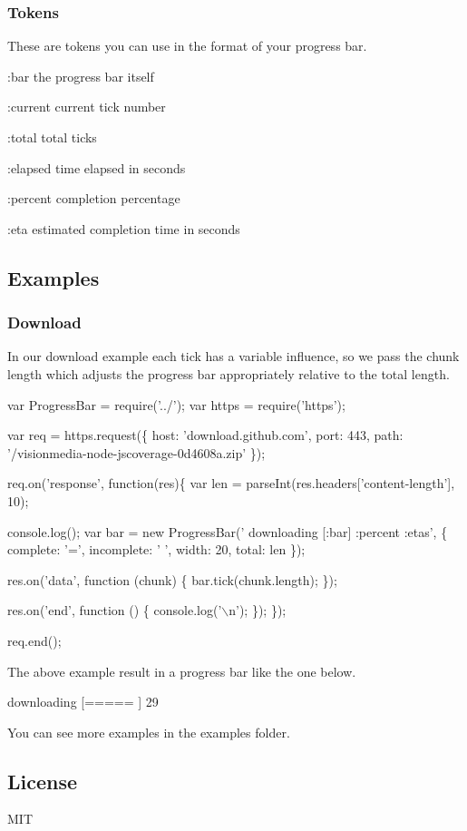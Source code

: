\subsubsection*{Tokens}

These are tokens you can use in the format of your progress bar.


\begin{DoxyItemize}
\item {\ttfamily \+:bar} the progress bar itself
\item {\ttfamily \+:current} current tick number
\item {\ttfamily \+:total} total ticks
\item {\ttfamily \+:elapsed} time elapsed in seconds
\item {\ttfamily \+:percent} completion percentage
\item {\ttfamily \+:eta} estimated completion time in seconds
\end{DoxyItemize}

\subsection*{Examples}

\subsubsection*{Download}

In our download example each tick has a variable influence, so we pass the chunk length which adjusts the progress bar appropriately relative to the total length.


\begin{DoxyCode}
var ProgressBar = require('../');
var https = require('https');

var req = https.request(\{
  host: 'download.github.com',
  port: 443,
  path: '/visionmedia-node-jscoverage-0d4608a.zip'
\});

req.on('response', function(res)\{
  var len = parseInt(res.headers['content-length'], 10);

  console.log();
  var bar = new ProgressBar('  downloading [:bar] :percent :etas', \{
    complete: '=',
    incomplete: ' ',
    width: 20,
    total: len
  \});

  res.on('data', function (chunk) \{
    bar.tick(chunk.length);
  \});

  res.on('end', function () \{
    console.log('\(\backslash\)n');
  \});
\});

req.end();
\end{DoxyCode}


The above example result in a progress bar like the one below.


\begin{DoxyCode}
downloading [=====             ] 29%
\end{DoxyCode}


You can see more examples in the {\ttfamily examples} folder.

\subsection*{License}

M\+IT 
